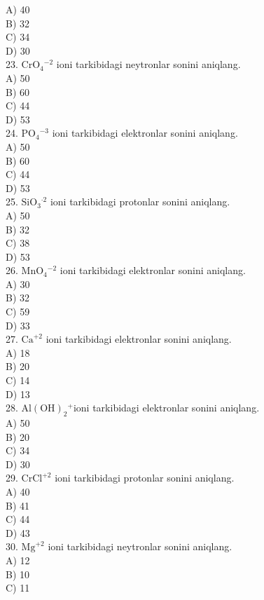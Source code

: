 A) 40\\
B) 32\\
C) 34\\
D) 30\\
23. $\mathrm{CrO}_{4}{ }^{-2}$ ioni tarkibidagi neytronlar sonini aniqlang.\\
A) 50\\
B) 60\\
C) 44\\
D) 53\\
24. $\mathrm{PO}_{4}{ }^{-3}$ ioni tarkibidagi elektronlar sonini aniqlang.\\
A) 50\\
B) 60\\
C) 44\\
D) 53\\
25. $\mathrm{SiO}_{3}{ }^{\cdot 2}$ ioni tarkibidagi protonlar sonini aniqlang.\\
A) 50\\
B) 32\\
C) 38\\
D) 53\\
26. $\mathrm{MnO}_{4}{ }^{-2}$ ioni tarkibidagi elektronlar sonini aniqlang.\\
A) 30\\
B) 32\\
C) 59\\
D) 33\\
27. $\mathrm{Ca}^{+2}$ ioni tarkibidagi elektronlar sonini aniqlang.\\
A) 18\\
B) 20\\
C) 14\\
D) 13\\
28. $\mathrm{Al}(\mathrm{OH})_{2}{ }^{+}$ioni tarkibidagi elektronlar sonini aniqlang.\\
A) 50\\
B) 20\\
C) 34\\
D) 30\\
29. $\mathrm{CrCl}^{+2}$ ioni tarkibidagi protonlar sonini aniqlang.\\
A) 40\\
B) 41\\
C) 44\\
D) 43\\
30. $\mathrm{Mg}^{+2}$ ioni tarkibidagi neytronlar sonini aniqlang.\\
A) 12\\
B) 10\\
C) 11\\
